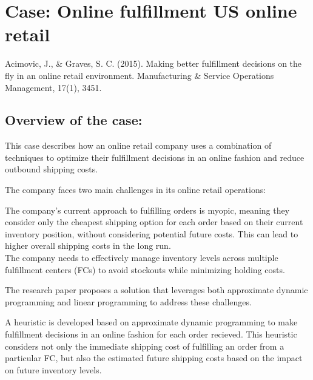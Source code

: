 \documentclass[letterpaper,10pt,english]{jupyterBook}
\begin{document}
\chapter{Case: Online fulfillment \sphinxhyphen{} US online retail}
\label{\detokenize{docs/Case2_online_fulfillment:case-online-fulfillment-us-online-retail}}\label{\detokenize{docs/Case2_online_fulfillment::doc}}
\sphinxAtStartPar
{}
Acimovic, J., \& Graves, S. C. (2015). Making better fulfillment decisions on the fly in an online retail environment. Manufacturing \& Service Operations Management, 17(1), 34\sphinxhyphen{}51.


\section{Overview of the case:}
\label{\detokenize{docs/Case2_online_fulfillment:overview-of-the-case}}
\sphinxAtStartPar
This case describes how an online retail company uses a combination of techniques to optimize their fulfillment decisions in an online fashion and reduce outbound shipping costs.

\sphinxAtStartPar
{}

\sphinxAtStartPar
The company faces two main challenges in its online retail operations:

\sphinxAtStartPar
{} The company’s current approach to fulfilling orders is myopic, meaning they consider only the cheapest shipping option for each order based on their current inventory position, without considering potential future costs. This can lead to higher overall shipping costs in the long run.\\
 The company needs to effectively manage inventory levels across multiple fulfillment centers (FCs) to avoid stockouts while minimizing holding costs.

\sphinxAtStartPar
{}

\sphinxAtStartPar
The research paper proposes a solution that leverages both approximate dynamic programming and linear programming to address these challenges.

\sphinxAtStartPar
{} A heuristic is developed based on approximate dynamic programming to make fulfillment decisions in an online fashion for each order recieved. This heuristic considers not only the immediate shipping cost of fulfilling an order from a particular FC, but also the estimated future shipping costs based on the impact on future inventory levels.
\end{document}
